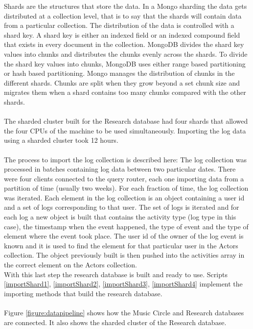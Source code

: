\documentclass[11pt, oneside]{article}   	%
\begin{document}
Shards are the structures that store the data. In a Mongo sharding the data gets distributed at a collection level, that is to say that the shards will contain data from a particular collection. The distribution of the data is controlled with a shard key. A shard key is either an indexed field or an indexed compound field that exists in every document in the collection. MongoDB divides the shard key values into chunks and distributes the chunks evenly across the shards. To divide the shard key values into chunks, MongoDB uses either range based partitioning or hash based partitioning. Mongo manages the distribution of chunks in the different shards. Chunks are split when they grow beyond a set chunk size and migrates them when a shard contains too many chunks compared with the other shards.\\\\
The sharded cluster built for the Research database had four shards that allowed the four CPUs of the machine to be used simultaneously. Importing the log data using a sharded cluster took 12 hours.\\\\ 
The process to import the log collection is described here: The log collection was processed in batches containing log data between two particular dates. There were four clients connected to the query router, each one importing data from a partition of time (usually two weeks). For each fraction of time, the log collection was iterated. Each element in the log collection is an object containing a user id and a set of logs corresponding to that user. The set of logs is iterated and for each log a new object is built that contains the activity type (log type in this case), the timestamp when the event happened, the type of event and the type of element where the event took place.  The user id of the owner of the log event is known and it is used to find the element for that particular user in the Actors collection. The object previously built is then pushed into the activities array in the correct element on the Actors collection.\\
With this last step the research database is built and ready to use. Scripts \ref{importShard1}, \ref{importShard2}, \ref{importShard3}, \ref{importShard4} implement the importing methods that build the research database.\\\\
Figure \ref{figure:datapipeline} shows how the Music Circle and Research databases are connected. It also shows the sharded cluster of the Research database.
\end{document}
